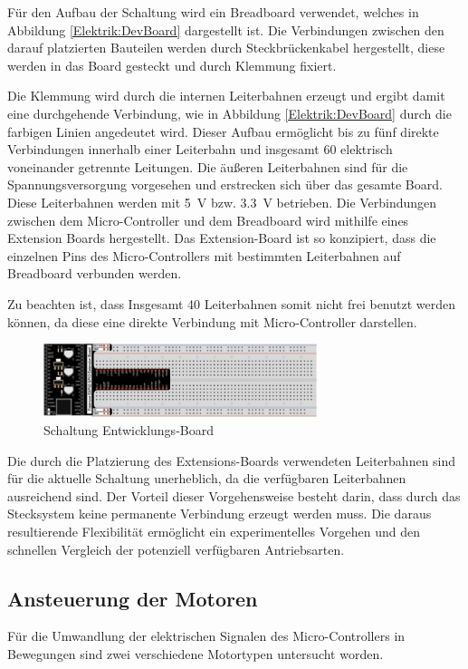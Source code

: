 \documentclass[conference,compsoc,final,a4paper]{IEEEtran}
\begin{document}
Für den Aufbau der Schaltung wird ein Breadboard verwendet, welches in Abbildung \ref{Elektrik:DevBoard} dargestellt ist. Die Verbindungen zwischen den darauf platzierten Bauteilen werden durch Steckbrückenkabel hergestellt, diese werden in das Board gesteckt und durch Klemmung fixiert.

\noindent Die Klemmung wird durch die internen Leiterbahnen erzeugt und ergibt damit eine durchgehende Verbindung, wie in Abbildung \ref{Elektrik:DevBoard} durch die farbigen Linien angedeutet wird. 
Dieser Aufbau ermöglicht bis zu fünf direkte Verbindungen innerhalb einer Leiterbahn und insgesamt 60 elektrisch voneinander getrennte Leitungen.
Die äußeren Leiterbahnen sind für die Spannungsversorgung vorgesehen und erstrecken sich über das gesamte Board. Diese Leiterbahnen werden mit \qty{5}{V} bzw. \qty{3,3}{V} betrieben.
Die Verbindungen zwischen dem Micro-Controller und dem Breadboard wird mithilfe eines Extension Boards hergestellt. Das Extension-Board ist so konzipiert, 
dass die einzelnen Pins des Micro-Controllers mit bestimmten Leiterbahnen auf Breadboard verbunden werden.

\noindent Zu beachten ist, dass Insgesamt 40 Leiterbahnen somit nicht frei benutzt werden können, da diese eine direkte Verbindung mit Micro-Controller darstellen.
\begin{figure}[h]
\centering
\includegraphics[width=8cm]{../images/ext_board.png}
\caption{Schaltung Entwicklungs-Board \autocite{freenoveTutorial}}
\label{Elektrik:DevBoardext}
\end{figure}

\noindent Die durch die Platzierung des Extensions-Boards verwendeten Leiterbahnen sind für die aktuelle Schaltung unerheblich, da die verfügbaren Leiterbahnen ausreichend sind. Der Vorteil dieser Vorgehensweise besteht darin, dass durch das Stecksystem keine permanente Verbindung erzeugt werden muss. 
Die daraus resultierende Flexibilität ermöglicht ein experimentelles Vorgehen und den schnellen Vergleich der potenziell verfügbaren Antriebsarten.

\subsection{Ansteuerung der Motoren}
Für die Umwandlung der elektrischen Signalen des Micro-Controllers in Bewegungen sind zwei verschiedene Motortypen untersucht worden.
\end{document}
